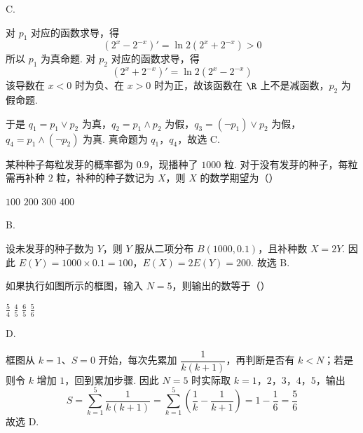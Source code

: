 \begin{answer}
C.
\end{answer}

\begin{solution}
对 \(p_{1}\) 对应的函数求导，得
\[
\left(2^x-2^{-x}\right)'=\ln2\left(2^x+2^{-x}\right)>0
\]
所以 \(p_{1}\) 为真命题. 对 \(p_{2}\) 对应的函数求导，得
\[
\left(2^x+2^{-x}\right)'=\ln2\left(2^x-2^{-x}\right)
\]
该导数在 \(x<0\) 时为负、在 \(x>0\) 时为正，故该函数在 \(\R\) 上不是减函数，\(p_{2}\) 为假命题.

于是 \(q_{1}=p_{1}\vee p_{2}\) 为真，\(q_{2}=p_{1}\wedge p_{2}\) 为假，\(q_{3}=(\neg p_{1})\vee p_{2}\) 为假，\(q_{4}=p_{1}\wedge(\neg p_{2})\) 为真. 真命题为 \(q_{1}\)，\(q_{4}\)，故选 C.
\end{solution}

\begin{problem}
某种种子每粒发芽的概率都为 \(0.9\)，现播种了 \(1000\text{ 粒}\). 对于没有发芽的种子，每粒需再补种 \(2\text{ 粒}\)，补种的种子数记为 \(X\)，则 \(X\) 的数学期望为（\quad）

\choices
    {\(100\)}
    {\(200\)}
    {\(300\)}
    {\(400\)}
\end{problem}

\begin{answer}
B.
\end{answer}

\begin{solution}
设未发芽的种子数为 \(Y\)，则 \(Y\) 服从二项分布 \(B(1000,0.1)\)，且补种数 \(X=2Y\). 因此
\(E(Y)=1000\times0.1=100\)，\(E(X)=2E(Y)=200\).
故选 B.
\end{solution}

\begin{problem}
如果执行如图所示的框图，输入 \(N = 5\)，则输出的数等于（\quad）


\choices
    {\(\frac{5}{4}\)}
    {\(\frac{4}{5}\)}
    {\(\frac{6}{5}\)}
    {\(\frac{5}{6}\)}
\end{problem}

\begin{answer}
D.
\end{answer}

\begin{solution}
框图从 \(k=1\)、\(S=0\) 开始，每次先累加 \(\dfrac{1}{k(k+1)}\)，再判断是否有 \(k<N\)；若是则令 \(k\) 增加 \(1\)，回到累加步骤. 因此 \(N=5\) 时实际取 \(k=1\)，\(2\)，\(3\)，\(4\)，\(5\)，输出
\[
S=\sum_{k=1}^{5}\frac{1}{k(k+1)}
 =\sum_{k=1}^{5}\left(\frac1k-\frac1{k+1}\right)
 =1-\frac16=\frac56
\]
故选 D.
\end{solution}

